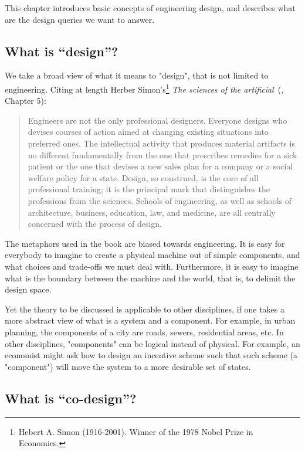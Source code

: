 This chapter introduces basic concepts of engineering design, and describes what are the design queries we want to answer.


\subsection{What is ``design''?}

We take a broad view of what it means to "design", that is not limited to engineering. Citing at length 
Herber Simon's\footnote{Hebert A. Simon (1916-2001). Winner of the 1978 Nobel Prize in Economics.}
\emph{The sciences of the artificial}~(\cite{hebert96sciences}, Chapter 5):

\begin{quote}
    Engineers are not the only professional designers. Everyone designs who devises courses of action aimed at changing existing situations into preferred ones. The intellectual activity that produces material artifacts is no different fundamentally from the one that prescribes remedies for a sick patient or the one that devises a new sales plan for a company or a social welfare policy for a state. Design, so construed, is the core of all professional training; it is the principal mark that distinguishes the professions from the sciences. Schools of engineering, as well as schools of architecture, business, education, law, and medicine, are all centrally concerned with the process of design.
\end{quote} 

The metaphors used in the book are biased towards engineering.
It is easy for everybody to imagine to create a physical machine out of simple components,
and what choices and trade-offs we must deal with. Furthermore, it is easy to imagine
what is the boundary between the machine and the world, that is, to delimit the design space.

Yet the theory to be discussed is applicable to other disciplines, if one takes a more
abstract view of what is a system and a component. For example, in urban planning, the
components of a city are roads, sewers, residential areas, etc. In other disciplines,
"components" can be logical instead of physical. For example, an economist might ask how to
design an incentive scheme such that such scheme (a "component") will move the system to a more
desirable set of states.


\subsection{What is ``co-design''?}

